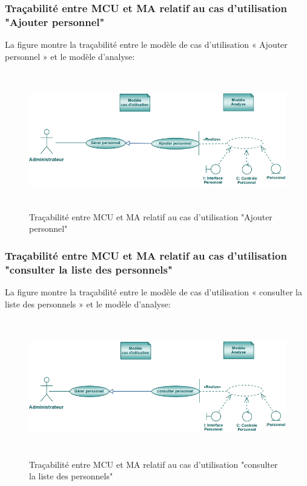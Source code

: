 \documentclass[12 pt]{report}
\begin{document}
\subsubsection{Traçabilité entre MCU et MA relatif au cas d’utilisation "Ajouter personnel" }
La figure  montre la traçabilité entre le modèle de cas d’utilisation « Ajouter personnel » et le modèle
d’analyse:
\begin{figure}[h]
\begin{center}
\includegraphics[width= 14cm , height =6cm]{tap.png}
\caption{Traçabilité entre MCU et MA relatif au cas d’utilisation "Ajouter personnel"}
\end{center}
\end{figure}
\subsubsection{Traçabilité entre MCU et MA relatif au cas d’utilisation "consulter la liste des personnels" }
La figure  montre la traçabilité entre le modèle de cas d’utilisation « consulter la liste des personnels » et le modèle
d’analyse:
\begin{figure}[h]
\begin{center}
\includegraphics[width= 14cm , height =6cm]{traconsabs.png}
\caption{Traçabilité entre MCU et MA relatif au cas d’utilisation "consulter la liste des personnels"}
\end{center}
\end{figure} 
\end{document}

